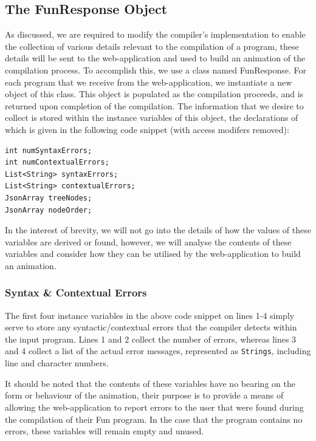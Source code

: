 \documentclass{l4proj}
\begin{document}
\subsection{The FunResponse Object}
As discussed, we are required to modify the compiler's implementation to enable the collection of various details relevant to the compilation of a program, these details will be sent to the web-application and used to build an animation of the compilation process. To accomplish this, we use a class named FunResponse. For each program that we receive from the web-application, we instantiate a new object of this class. This object is populated as the compilation proceeds, and is returned upon completion of the compilation. The information that we desire to collect is stored within the instance variables of this object, the declarations of which is given in the following code snippet (with access modifers removed):
\begin{lstlisting}
int numSyntaxErrors;
int numContextualErrors;
List<String> syntaxErrors;
List<String> contextualErrors;
JsonArray treeNodes;
JsonArray nodeOrder;
\end{lstlisting}

In the interest of brevity, we will not go into the details of how the values of these variables are derived or found, however, we will analyse the contents of these variables and consider how they can be utilised by the web-application to build an animation. 

\subsubsection{Syntax \& Contextual Errors}
The first four instance variables in the above code snippet on lines 1-4 simply serve to store any syntactic/contextual errors that the compiler detects within the input program. Lines 1 and 2 collect the number of errors, whereas lines 3 and 4 collect a list of the actual error messages, represented as \texttt{Strings}, including line and character numbers.

It should be noted that the contents of these variables have no bearing on the form or behaviour of the animation, their purpose is to provide a means of allowing the web-application to report errors to the user that were found during the compilation of their Fun program. In the case that the program contains no errors, these variables will remain empty and unused.
\end{document}
